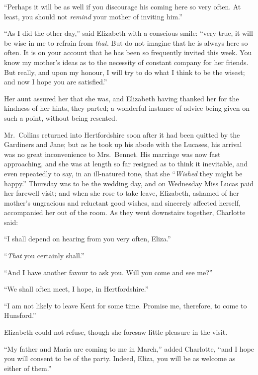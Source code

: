 \documentclass[12pt,english]{book}
\begin{document}
{}``Perhaps it will be as well if you discourage his coming here
so very often. At least, you should not \textit{remind} your mother
of inviting him.''

{}``As I did the other day,'' said Elizabeth with a conscious smile:
{}``very true, it will be wise in me to refrain from \textit{that}.
But do not imagine that he is always here so often. It is on your
account that he has been so frequently invited this week. You know
my mother's ideas as to the necessity of constant company for her
friends. But really, and upon my honour, I will try to do what I think
to be the wisest; and now I hope you are satisfied.''

Her aunt assured her that she was, and Elizabeth having thanked her
for the kindness of her hints, they parted; a wonderful instance of
advice being given on such a point, without being resented.

Mr.\ Collins returned into Hertfordshire soon after it had been quitted
by the Gardiners and Jane; but as he took up his abode with the Lucases,
his arrival was no great inconvenience to Mrs.\ Bennet. His marriage
was now fast approaching, and she was at length so far resigned as
to think it inevitable, and even repeatedly to say, in an ill-natured
tone, that she {}``\textit{Wished} they might be happy.'' Thursday
was to be the wedding day, and on Wednesday Miss Lucas paid her farewell
visit; and when she rose to take leave, Elizabeth, ashamed of her
mother's ungracious and reluctant good wishes, and sincerely affected
herself, accompanied her out of the room. As they went downstairs
together, Charlotte said:

{}``I shall depend on hearing from you very often, Eliza.''

{}``\textit{That} you certainly shall.''

{}``And I have another favour to ask you. Will you come and see me?''\ 

{}``We shall often meet, I hope, in Hertfordshire.''

{}``I am not likely to leave Kent for some time. Promise me, therefore,
to come to Hunsford.''

Elizabeth could not refuse, though she foresaw little pleasure in
the visit.

{}``My father and Maria are coming to me in March,'' added Charlotte,
{}``and I hope you will consent to be of the party. Indeed, Eliza,
you will be as welcome as either of them.''
\end{document}
